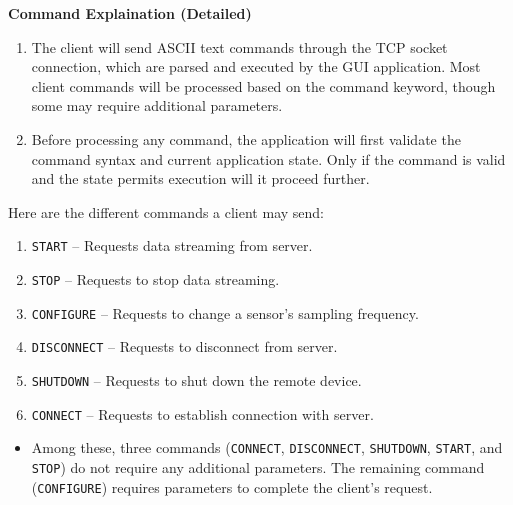 \textbf{Command Explaination (Detailed)}
\begin{enumerate}
\item The client will send ASCII text commands through the TCP socket connection, which are parsed and executed by the GUI application. Most client commands will be processed based on the command keyword, though some may require additional parameters.
\item Before processing any command, the application will first validate the command syntax and current application state. Only if the command is valid and the state permits execution will it proceed further.
\end{enumerate}

Here are the different commands a client may send:

\begin{enumerate}
    \item \texttt{START} -- Requests data streaming from server.
    \item \texttt{STOP} -- Requests to stop data streaming.
    \item \texttt{CONFIGURE} -- Requests to change a sensor's sampling frequency.
    \item \texttt{DISCONNECT} -- Requests to disconnect from server.
    \item \texttt{SHUTDOWN} -- Requests to shut down the remote device.
    \item \texttt{CONNECT} -- Requests to establish connection with server.
\end{enumerate}

\begin{itemize}
    \item Among these, three commands (\texttt{CONNECT}, \texttt{DISCONNECT},
    \texttt{SHUTDOWN}, \texttt{START}, and \texttt{STOP}) do not require any additional
    parameters. The remaining command (\texttt{CONFIGURE}) requires parameters to
    complete the client's request.
\end{itemize}

